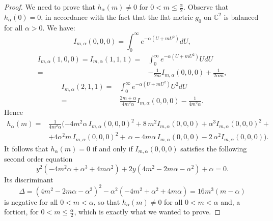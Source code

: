 \documentclass[11pt, reqno]{amsart}
\begin{document}
\begin{proof}
We need to prove that $h_{\alpha}(m)\neq 0$ for  $0<m\leq\frac{\alpha}{2}$.
Observe  that $h_{\alpha}(0)=0$, in accordance with the fact that the flat metric $g_0$ on ${\mathbb{C}}^2$ is balanced for all $\alpha >0$. We have:
\begin{equation}
I_{m, \alpha}(0,0,0)= \int_{0}^{\infty} e^{- \alpha (U + m U^2)}dU,
\end{equation}
\begin{equation}
\begin{split}
I_{m, \alpha}(1,0,0)= I_{m, \alpha}(1,1,1)=&\int_{0}^{\infty} e^{- \alpha (U + m U^2)}UdU\\
=&-\frac{1}{2 m}I_{m, \alpha}(0,0,0)+{\frac {1}{2\alpha m}},
\end{split}
\end{equation}
\begin{equation}
\begin{split}
I_{m, \alpha}(2,1,1)=&\int_{0}^{\infty} e^{- \alpha (U + m U^2)}U^2dU\\
=&\frac{2m+\alpha}{4m^2 \alpha}I_{m, \alpha}(0,0,0)-\frac {1}{4m^2\alpha}.
\end{split}
\end{equation}
Hence
\begin{equation}
\begin{split}
h_{\alpha}(m)=&\frac{1}{4m^2\alpha}(-4 m^2\alpha \,I_{m, \alpha}(0,0,0)^2 + 8\,m^2I_{m, \alpha}(0,0,0) + \alpha^3 I_{m, \alpha}(0,0,0)^2+  \\
&+4 \alpha^2 m \,I_{m, \alpha}(0,0,0)^2  + \,\alpha - 4 m\alpha \, I_{m, \alpha}(0,0,0) - 2\,\alpha^2 I_{m, \alpha}(0,0,0)).\nonumber
\end{split}
\end{equation}
It follows that $h_{\alpha}(m)=0$ if and only if $I_{m, \alpha}(0,0,0)$ satisfies the following second order equation
\begin{equation}
y^2(-4m^2 \alpha + \alpha^3 +4m \alpha^2)+2y(4 m^2 - 2 m \alpha - \alpha^2)+ \alpha =0.\nonumber
\end{equation}
Its discriminant
\begin{equation}
\Delta= (4 m^2 - 2 m \alpha -  \alpha^2)^2 - \alpha^2 (-4m^2 + \alpha^2 +4m \alpha) = 16m^3(m - \alpha)\nonumber
\end{equation}
is negative for all  $0<m<\alpha$, so that $h_{\alpha}(m)\neq 0$ for all $0 < m < \alpha$ and, a fortiori,  for $0<m\leq\frac{\alpha}{2}$,
which is exactly what we wanted to prove.
\end{proof}
\end{document}
